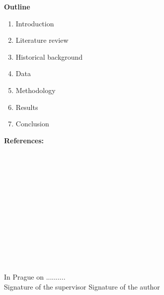 \noindent \large{\bf  Outline}
\begin{enumerate}
\item Introduction
 \item Literature review 
 \item Historical background
 \item Data
 \item Methodology
 \item Results
 \item Conclusion 
\end{enumerate}
\medskip
\large{\bf References:}\\
 \\
 \\
 \\
 \\
 \\
 \\
 \\
 \\
 \\
 \\
 \\
\\
\vspace{15mm}\\
In Prague on ..........\newline \\
Signature of the supervisor \hspace{30mm} Signature of the author
